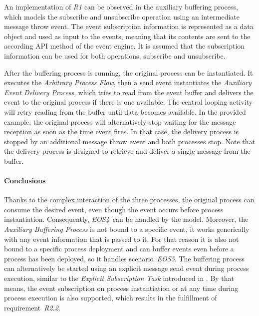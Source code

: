 An implementation of \textit{R1} can be observed in the auxiliary buffering process, which models the subscribe and unsubscribe operation using an intermediate message throw event. The event subscription information is represented as a data object and used as input to the events, meaning that its contents are sent to the according API method of the event engine. It is assumed that the subscription information can be used for both operations, subscribe and unsubscribe.

After the buffering process is running, the original process can be instantiated. 
It executes the \textit{Arbitrary Process Flow}, then a send event instantiates the \textit{Auxiliary Event Delivery Process}, which tries to read from the event buffer and delivers the event to the original process if there is one available. 
The central looping activity will retry reading from the buffer until data becomes available.
In the provided example, the original process will alternatively stop waiting for the message reception as soon as the time event fires. In that case, the delivery process is stopped by an additional message throw event and both processes stop.
Note that the delivery process is designed to retrieve and deliver a single message from the buffer.

\paragraph{Conclusions}
Thanks to the complex interaction of the three processes, the original process can consume the desired event, even though the event occurs before process instantiation. Consequently, \textit{EOS4}~can be handled by the model. 
Moreover, the \textit{Auxiliary Buffering Process} is not bound to a specific event, it works generically with any event information that is passed to it. For that reason it is also not bound to a specific process deployment and can buffer events even before a process has been deployed, so it handles scenario~\textit{EOS5}.
The buffering process can alternatively be started using an explicit message send event during process execution, similar to the \textit{Explicit Subscription Task} introduced in \cite{mandal:2017}. By that means, the event subscription on process instantiation or at any time during process execution is also supported, which results in the fulfillment of requirement~\textit{R2.2}.



